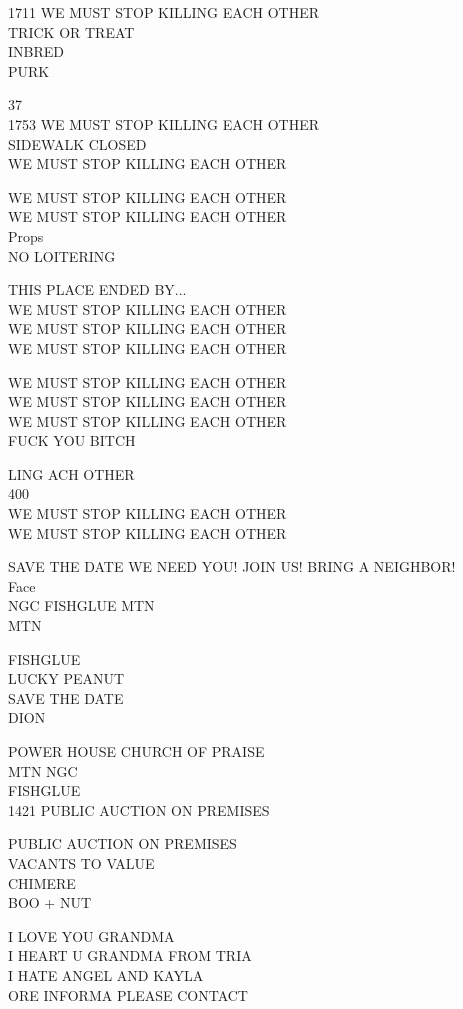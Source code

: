 \documentclass[10pt,letterpaper]{article}
\begin{document}
1711 WE MUST STOP KILLING EACH OTHER\\
TRICK OR TREAT\\
INBRED\\
PURK

37\\
1753 WE MUST STOP KILLING EACH OTHER\\
SIDEWALK CLOSED\\
WE MUST STOP KILLING EACH OTHER

WE MUST STOP KILLING EACH OTHER\\
WE MUST STOP KILLING EACH OTHER\\
Props\\
NO LOITERING

THIS PLACE ENDED BY...\\
WE MUST STOP KILLING EACH OTHER\\
WE MUST STOP KILLING EACH OTHER\\
WE MUST STOP KILLING EACH OTHER

WE MUST STOP KILLING EACH OTHER\\
WE MUST STOP KILLING EACH OTHER\\
WE MUST STOP KILLING EACH OTHER\\
FUCK YOU BITCH

LING ACH OTHER\\
400\\
WE MUST STOP KILLING EACH OTHER\\
WE MUST STOP KILLING EACH OTHER

SAVE THE DATE WE NEED YOU!  JOIN US!  BRING A NEIGHBOR!\\
Face\\
NGC FISHGLUE MTN\\
MTN

FISHGLUE\\
LUCKY PEANUT\\
SAVE THE DATE\\
DION

POWER HOUSE CHURCH OF PRAISE\\
MTN NGC\\
FISHGLUE\\
1421 PUBLIC AUCTION ON PREMISES

PUBLIC AUCTION ON PREMISES\\
VACANTS TO VALUE\\
CHIMERE\\
BOO + NUT

I LOVE YOU GRANDMA\\
I HEART U GRANDMA FROM TRIA\\
I HATE ANGEL AND KAYLA\\
ORE INFORMA PLEASE CONTACT
\end{document}

